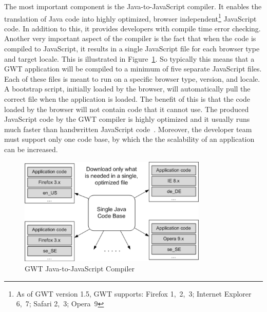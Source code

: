 The most important component is the Java-to-JavaScript compiler. It enables the 
translation of Java code into highly optimized, browser 
independent\footnote{As of GWT version 1.5, GWT supports: 
Firefox 1,~2,~3; Internet Explorer 6,~7; Safari 2,~3; Opera~9}
JavaScript code. 
In addition to this, it provides developers with compile time error checking. 
Another very important
aspect of the compiler is the fact that when the code is compiled to JavaScript,
it results in 
a single JavaScript file for each browser type and target locale. This is illustrated 
in Figure~\ref{fig:gwt01}. So typically this means that a GWT application will be compiled to 
a minimum of five separate JavaScript files. Each of these files is meant to run 
on a specific browser type, version, and locale. A bootstrap script, initially 
loaded by the browser, will 
automatically pull the correct file when the
application is loaded. The benefit of this is that the code loaded by the browser 
will not contain code that it cannot use. The produced JavaScript code by the GWT 
compiler is highly optimized and it usually runs much faster than handwritten 
JavaScript code~\cite{wgio1}. Moreover, the developer team must support only
one code base, by which the the scalability of an application can be increased.  

\begin{figure}[h]
	\begin{center}
		\includegraphics[width=0.8\textwidth]{./img/gwt01a.png}
		\caption{GWT Java-to-JavaScript Compiler}
		\label{fig:gwt01}
	\end{center}
\end{figure}

